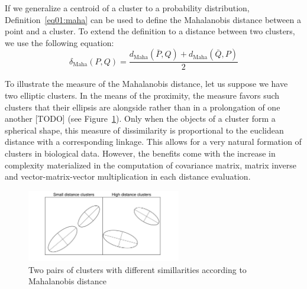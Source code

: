 If we generalize a centroid of a cluster to a probability distribution, Definition~\ref{eq01:maha} can be used to define the Mahalanobis distance between a point and a cluster. To extend the definition to a distance between two clusters, we use the following equation:
\begin{equation}
    \delta_\text{Maha}(P,Q) = \frac{d_\text{Maha}(\bar{P},Q) + d_\text{Maha}(\bar{Q},P)}{2}
\end{equation}\label{eq01:maha_linkage}

To illustrate the measure of the Mahalanobis distance, let us suppose we have two elliptic clusters. In the means of the proximity, the measure favors such clusters that their ellipsis are alongside rather than in a prolongation of one another [TODO] (see Figure~\ref{fig:ellipses}). 
Only when the objects of a cluster form a spherical shape, this measure of dissimilarity is proportional to the euclidean distance with a corresponding linkage.
This allows for a very natural formation of clusters in biological data. However, the benefits come with the increase in complexity materialized in the computation of covariance matrix, matrix inverse and vector-matrix-vector multiplication in each distance evaluation.

\begin{figure}[h]
    \centering
    \includegraphics[width=0.6\textwidth]{img/ellipses.pdf}
    \caption{Two pairs of clusters with different simillarities according to Mahalanobis distance}
    \label{fig:ellipses}
\end{figure}



